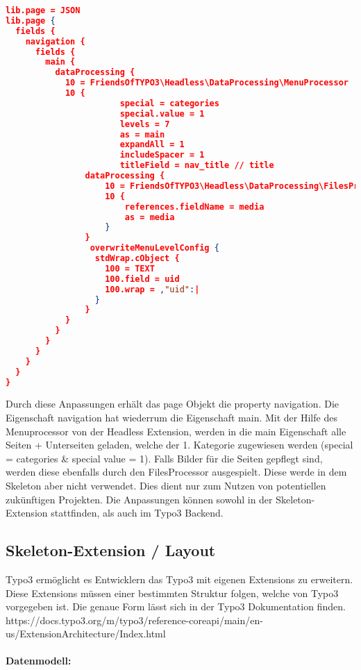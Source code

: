 \begin{lstlisting}[language=json,firstnumber=1]
lib.page = JSON
lib.page {
  fields {
    navigation {
      fields {
        main {
          dataProcessing {
            10 = FriendsOfTYPO3\Headless\DataProcessing\MenuProcessor
            10 {              
				       special = categories
				       special.value = 1
				       levels = 7
				       as = main
				       expandAll = 1
				       includeSpacer = 1
				       titleField = nav_title // title	
              	dataProcessing {
                	10 = FriendsOfTYPO3\Headless\DataProcessing\FilesProcessor
                	10 {
                  		references.fieldName = media
                  		as = media
                	}
              	}
                 overwriteMenuLevelConfig {
                  stdWrap.cObject {
                    100 = TEXT
                    100.field = uid
                    100.wrap = ,"uid":|
                  }
                }   
            }
          }
        }
      }      
    }
  }
}
\end{lstlisting}
Durch diese Anpassungen erhält das page Objekt die property navigation. Die Eigenschaft navigation hat wiederrum die Eigenschaft main. Mit der Hilfe des Menuprocessor von der Headless Extension, werden in die main Eigenschaft alle Seiten + Unterseiten geladen, welche der 1. Kategorie zugewiesen werden (special = categories \& special value = 1). Falls Bilder für die Seiten gepflegt sind, werden diese ebenfalls durch den FilesProcessor ausgespielt. Diese werde in dem Skeleton aber nicht verwendet. Dies dient nur zum Nutzen von potentiellen zukünftigen Projekten. Die Anpassungen können sowohl in der Skeleton-Extension stattfinden, als auch im Typo3 Backend.

\subsection{Skeleton-Extension / Layout}
\label{sec:Skeleton-Extension / Layout}
Typo3 ermöglicht es Entwicklern das Typo3 mit eigenen Extensions zu erweitern. Diese Extensions müssen einer bestimmten Struktur folgen, welche von Typo3 vorgegeben ist. Die genaue Form lässt sich in der Typo3 Dokumentation finden. \newline https://docs.typo3.org/m/typo3/reference-coreapi/main/en-us/ExtensionArchitecture/Index.html
\paragraph{Datenmodell:}

